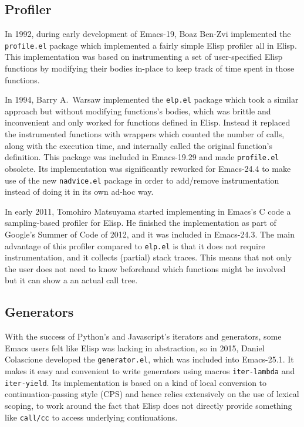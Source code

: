 \documentclass[format=acmsmall, review=false, screen=true]{acmart}
\newcommand \Elisp {Elisp}
\begin{document}
\subsection{Profiler}
\label{sec:profiler}

In 1992, during early development of Emacs-19, Boaz Ben-Zvi implemented the
\texttt{profile.el} package which implemented a fairly simple \Elisp{}
profiler all in \Elisp{}.  This implementation was based on instrumenting
a set of user-specified \Elisp{} functions by modifying their bodies in-place
to keep track of time spent in those functions.

In 1994, Barry A.~Warsaw implemented the \texttt{elp.el} package which took
a similar approach but without modifying functions's bodies, which was
brittle and inconvenient and only worked for functions defined in \Elisp.
Instead it replaced the instrumented functions with wrappers which counted
the number of calls, along with the execution time, and internally called
the original function's definition.  This package was included in
Emacs-19.29 and made \texttt{profile.el} obsolete.  Its implementation was
significantly reworked for Emacs-24.4 to make use of the new
\texttt{nadvice.el} package in order to add/remove instrumentation instead
of doing it in its own ad-hoc way.

In early 2011, Tomohiro Matsuyama started implementing in Emacs's C code
a sampling-based profiler for \Elisp{}.  He finished the implementation as
part of Google's Summer of Code of 2012, and it was included in Emacs-24.3.
The main advantage of this profiler compared to \texttt{elp.el} is that it
does not require instrumentation, and it collects (partial) stack traces.
This means that not only the user does not need to know beforehand which
functions might be involved but it can show a an actual call tree.

\subsection{Generators}

With the success of Python's and Javascript's iterators and generators, some
Emacs users felt like \Elisp{} was lacking in abstraction, so in 2015,
Daniel Colascione developed the \texttt{generator.el}, which was included
into Emacs-25.1.  It makes it easy and convenient to write generators using
macros \texttt{iter-lambda} and \texttt{iter-yield}.  Its implementation is
based on a kind of local conversion to continuation-passing style (CPS) and
hence relies extensively on the use of lexical scoping, to work around the
fact that \Elisp{} does not directly provide something like \texttt{call/cc}
to access underlying continuations.
\end{document}
